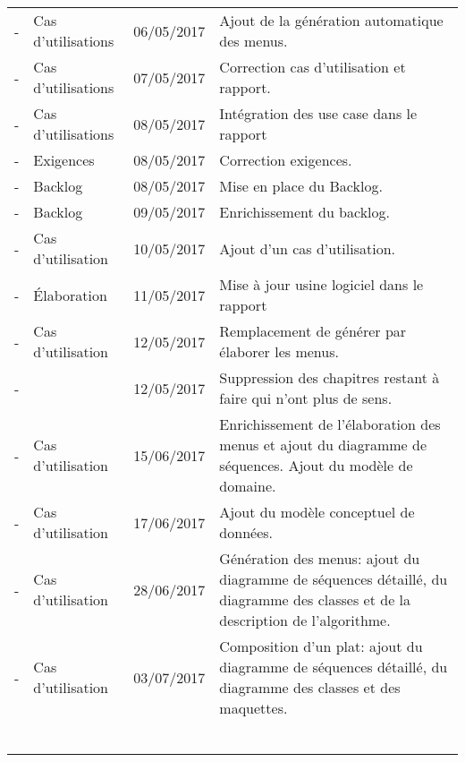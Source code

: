 \begin{tabular}{|c|p{3.5cm}|c|p{9cm}|}
  - & Cas d'utilisations & 06/05/2017 & Ajout de la génération automatique des menus.\\
  - & Cas d'utilisations & 07/05/2017 & Correction cas d'utilisation et rapport.\\
  - & Cas d'utilisations & 08/05/2017 & Intégration des use case dans le rapport\\
  - & Exigences & 08/05/2017 & Correction exigences.\\
  - & Backlog & 08/05/2017 & Mise en place du Backlog.\\
  - & Backlog & 09/05/2017 & Enrichissement du backlog.\\
  - & Cas d'utilisation  & 10/05/2017 & Ajout d'un cas d'utilisation.\\
  - & Élaboration  & 11/05/2017 & Mise à jour usine logiciel dans le rapport\\
  - & Cas d'utilisation & 12/05/2017 & Remplacement de générer par élaborer les menus.\\
  - & & 12/05/2017 & Suppression des chapitres restant à faire qui n'ont plus de sens.\\
  - & Cas d'utilisation & 15/06/2017 & Enrichissement de l'élaboration des menus et ajout du diagramme de séquences. Ajout du modèle de domaine.\\
  - & Cas d'utilisation & 17/06/2017 & Ajout du modèle conceptuel de données. \\
  - & Cas d'utilisation & 28/06/2017 & Génération des menus: ajout du diagramme de séquences détaillé, du diagramme des classes et de la description de l'algorithme.\\
  - & Cas d'utilisation & 03/07/2017 & Composition d'un plat: ajout du diagramme de séquences détaillé, du diagramme des classes et des maquettes.\\
  &&&\\
  &&&\\
  &&&\\
  &&&\\
  &&&\\
  &&&\\ \hline
\end{tabular}
